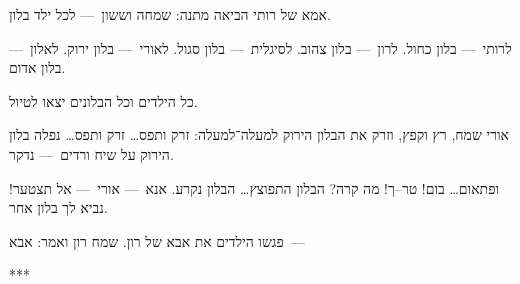 אמא של רותי הביאה מתנה:
שמחה וששון~—
לכל ילד בלון.

לרותי~— בלון כחול.
לרון~— בלון צהוב.
לסיגלית~— בלון סגול.
לאורי~— בלון ירוק.
לאלון~— בלון אדום.

כל הילדים וכל הבלונים יצאו לטיול.

אורי שמח, רץ וקפץ,
וזרק את הבלון הירוק למעלה־למעלה:
זרק ותפס… זרק ותפס…
נפלה בלון הירוק על שיח ורדים~— נדקר.

ופתאום… בום! טר–ך!
מה קרה?
הבלון התפוצץ… הבלון נקרע.
אנא~— אורי~— אל תצטער!
נביא לך בלון אחר.

פגשו הילדים את אבא של רון.
שמח רון ואמר:
אבא~—

***
